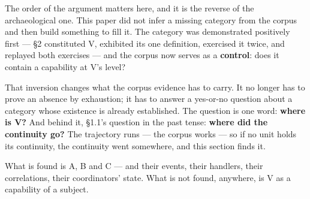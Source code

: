 \documentclass[
]{article}
\begin{document}
The order of the argument matters here, and it is the reverse of the
archaeological one. This paper did not infer a missing category from the
corpus and then build something to fill it. The category was
demonstrated positively first --- §2 constituted V, exhibited its one
definition, exercised it twice, and replayed both exercises --- and the
corpus now serves as a \textbf{control}: does it contain a capability at
V's level?

That inversion changes what the corpus evidence has to carry. It no
longer has to prove an absence by exhaustion; it has to answer a
yes-or-no question about a category whose existence is already
established. The question is one word: \textbf{where is V?} And behind
it, §1.1's question in the past tense: \textbf{where did the continuity
go?} The trajectory runs --- the corpus works --- so if no unit holds
its continuity, the continuity went somewhere, and this section finds
it.

What is found is A, B and C --- and their events, their handlers, their
correlations, their coordinators' state. What is not found, anywhere, is
V as a capability of a subject.
\end{document}

